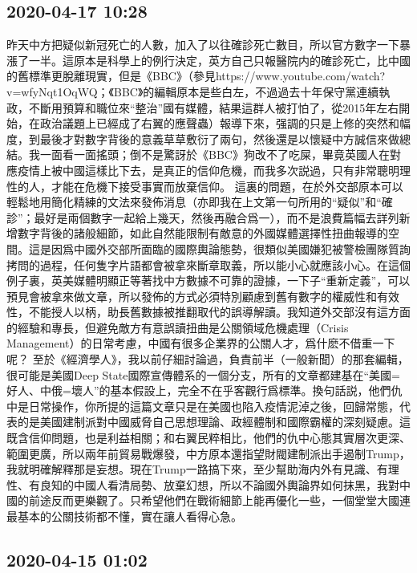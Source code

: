 \documentclass[twocolumn]{ctexart}
\begin{document}
\subsection*{2020-04-17 10:28}

昨天中方把疑似新冠死亡的人數，加入了以往確診死亡數目，所以官方數字一下暴漲了一半。這原本是科學上的例行決定，英方自己只報醫院内的確診死亡，比中國的舊標準更脫離現實，但是《BBC》（參見https://www.youtube.com/watch?v=wfyNqt1OqWQ；《BBC》的編輯原本是些白左，不過過去十年保守黨連續執政，不斷用預算和職位來“整治”國有媒體，結果這群人被打怕了，從2015年左右開始，在政治議題上已經成了右翼的應聲蟲）報導下來，强調的只是上修的突然和幅度，到最後才對數字背後的意義草草敷衍了兩句，然後還是以懷疑中方誠信來做總結。我一面看一面搖頭；倒不是驚訝於《BBC》狗改不了吃屎，畢竟英國人在對應疫情上被中國這樣比下去，是真正的信仰危機，而我多次説過，只有非常聰明理性的人，才能在危機下接受事實而放棄信仰。 
這裏的問題，在於外交部原本可以輕鬆地用簡化精練的文法來發佈消息（亦即我在上文第一句所用的“疑似”和“確診”；最好是兩個數字一起給上幾天，然後再融合爲一），而不是浪費篇幅去詳列新增數字背後的諸般細節，如此自然能限制有敵意的外國媒體選擇性扭曲報導的空間。這是因爲中國外交部所面臨的國際輿論態勢，很類似美國嫌犯被警檢團隊質詢拷問的過程，任何隻字片語都會被拿來斷章取義，所以能小心就應該小心。在這個例子裏，英美媒體明顯正等著找中方數據不可靠的證據，一下子“重新定義”，可以預見會被拿來做文章，所以發佈的方式必須特別顧慮到舊有數字的權威性和有效性，不能授人以柄，助長舊數據被推翻取代的誤導解讀。我知道外交部沒有這方面的經驗和專長，但避免敵方有意誤讀扭曲是公關領域危機處理（Crisis Management）的日常考慮，中國有很多企業界的公關人才，爲什麽不借重一下呢？ 
至於《經濟學人》，我以前仔細討論過，負責前半（一般新聞）的那套編輯，很可能是美國Deep State國際宣傳體系的一個分支，所有的文章都建基在“美國=好人、中俄=壞人”的基本假設上，完全不在乎客觀行爲標準。換句話説，他們仇中是日常操作，你所提的這篇文章只是在美國也陷入疫情泥淖之後，回歸常態，代表的是美國建制派對中國威脅自己思想理論、政經體制和國際霸權的深刻疑慮。這既含信仰問題，也是利益相關；和右翼民粹相比，他們的仇中心態其實層次更深、範圍更廣，所以兩年前貿易戰爆發，中方原本還指望財閥建制派出手遏制Trump，我就明確解釋那是妄想。現在Trump一路搞下來，至少幫助海内外有見識、有理性、有良知的中國人看清局勢、放棄幻想，所以不論國外輿論界如何抹黑，我對中國的前途反而更樂觀了。只希望他們在戰術細節上能再優化一些，一個堂堂大國連最基本的公關技術都不懂，實在讓人看得心急。
\subsection*{2020-04-15 01:02}
\end{document}
